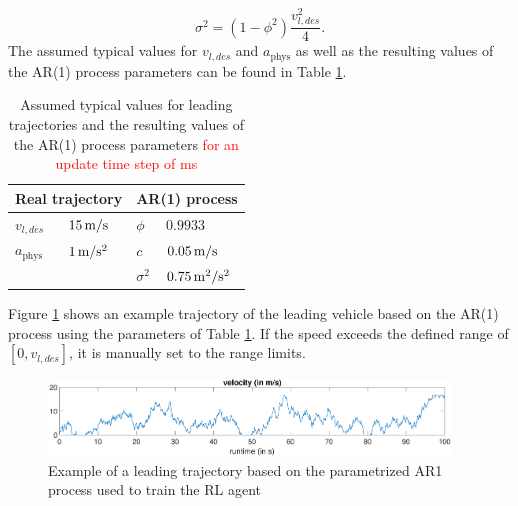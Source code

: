 \documentclass[review]{elsarticle}
\providecommand{\red}[1]{\textcolor{red}{#1}}
\providecommand{\martin}[1]{\red{#1}} %
\providecommand{\sub}[1]{_{\mathrm{#1}}}  %
\providecommand{\3}{{\ss}}
\begin{document}
 \begin{equation}
 \sigma^2=(1-\phi^2)\frac{v_{l,des}^2}{4}.
\end{equation}
The assumed typical values for $v_{l,des}$ and  $a\sub{phys}$ as well as the resulting values of the AR(1) process parameters can be found in Table \ref{tab:AR1Parameters}.

\begin{table}
	\caption{Assumed typical values for leading trajectories and
          the resulting values of the AR(1) process parameters \martin{for an
          update time step of \unit[100]{ms}}} 
	\label{tab:AR1Parameters} 
	\begin{center}
		\begin{tabular}{ p{} p{} |p{} p{}  }
			 \multicolumn{2}{c|}{Real trajectory} & \multicolumn{2}{c}{AR(1) process}   \\ \hline
			$v_{l,des}$ &$\unit[15]{m/s}$ &$\phi$ & $0.9933$\\
			$a\sub{phys}$ &$\unit[1]{m/s^2}$ &$c$ & $\unit[0.05]{m/s}$\\
			& & $\sigma^2$ & $\unit[0.75]{m^2/s^2}$
			
		\end{tabular}
	\end{center}
\end{table}

Figure \ref{fig:AR1process} shows an example trajectory of the leading vehicle based on the AR(1) process using the parameters of Table \ref{tab:AR1Parameters}. If the speed exceeds the defined range of $[0, v_{l,des}]$, it is manually set to the range limits.
\begin{figure}
	\centering
	\includegraphics[width=0.95\textwidth]{images/AR1process}
	\caption{Example of a leading trajectory based on the parametrized AR1 process used to train the RL agent}
	\label{fig:AR1process}
\end{figure}
\end{document}
